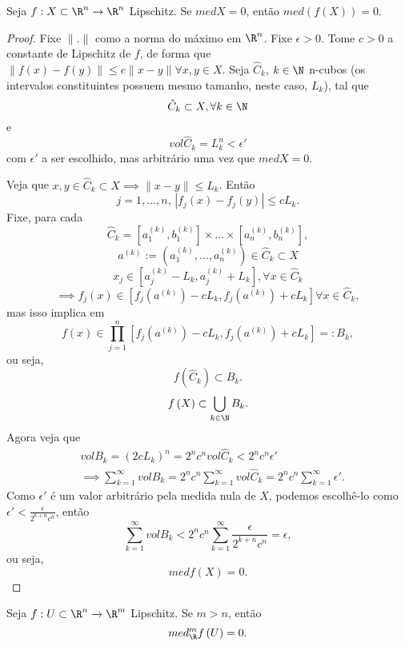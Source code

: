 \begin{prop}
    Seja $f : X\subset \R^{n}\to \R^{n}$ Lipschitz. Se $med X = 0$, então $med\left(  f\left( X \right)\right)   = 0$.
\end{prop}
\begin{proof}
    Fixe $\|.\|$ como a norma do máximo em $\R^{n}$. Fixe $\epsilon>0$. Tome $c>0$ a constante de Lipschitz de $f$, de forma que $\|f\left( x \right) -f\left( y \right) \| \le  c \|x-y\| \forall x, y \in X$. Seja $\hat{C}_k$, $k\in \N$ n-cubos (os intervalos constituintes possuem mesmo tamanho, neste caso, $L_k$), tal que \[
    \hat{C}_k \subset X, \forall k\in \N
    \] e \[
    vol \hat{C}_k = L_k^{n} < \epsilon'
    \] com $\epsilon'$ a ser escolhido, mas arbitrário uma vez que $med X = 0$.

    Veja que $x, y \in \hat{C}_k\subset X \implies \|x-y\|\le L_k$. Então \[
    j=1,\ldots,n\text{, } \left| f_j\left( x \right) - f_j\left( y \right)  \right| \le cL_k
    .\] Fixe, para cada \[
    \hat{C}_k = \left[ a_1^{(k)}, b_1^{(k)} \right] \times \ldots\times \left[ a_n^{(k)}, b_n^{(k)} \right]
    ,\] \[
    a^{(k)} := \left( a_1^{(k)}, \ldots, a_n^{(k)} \right) \in \hat{C}_k\subset X
    \] \[
    x_j\in \left[ a_j^{(k)}-L_k, a_j^{(k)}+L_k \right] , \forall x\in \hat{C}_k
    \]  \[
    \implies f_j\left( x \right) \in \left[ f_j\left( a^{(k)} \right) -cL_k, f_j\left( a^{(k)} \right) +cL_k \right] \forall x \in \hat{C}_k
    ,\] mas isso implica em \[
    f\left( x \right) \in \prod_{j=1}^{n}  \left[ f_j\left( a^{(k)} \right) -cL_k, f_j\left( a^{(k)} \right) +cL_k \right] =: B_k
    ,\] ou seja, \[
    f\left( \hat{C}_k \right) \subset B_k
    .\] \[
    f\left( X \right) \subset \bigcup_{k\in \N} B_k
    .\] Agora veja que 
    \begin{align*}
    & vol B_k = \left( 2cL_k \right) ^{n} = 2^{n}c^{n} vol \hat{C}_k < 2^{n}c^{n}\epsilon' \\ 
    & \implies \sum_{k=1}^{\infty} vol B_k = 2^{n}c^{n}\sum_{k=1}^{\infty} vol \hat{C}_k = 2^{n}c^{n}\sum_{k=1}^{\infty} \epsilon'
    .\end{align*}
    Como $\epsilon'$ é um valor arbitrário pela medida nula de $X$, podemos escolhê-lo como $\epsilon' < \frac{\epsilon}{2^{k+n}c^{n}}$, então \[
    \sum_{k=1}^{\infty} vol B_k < 2^{n}c^{n}\sum_{k=1}^{\infty}\frac{\epsilon}{2^{k+n}c^{n}} = \epsilon
    ,\] ou seja, \[
    med f\left( X \right) = 0
.\] 
\end{proof}

\begin{corollary}
    Seja $f: U\subset \R^{n}\to \R^{m}$ Lipschitz. Se $m>n$, então \[
    med_\R^{m} f\left( U \right) = 0
    .\] 
\end{corollary}

